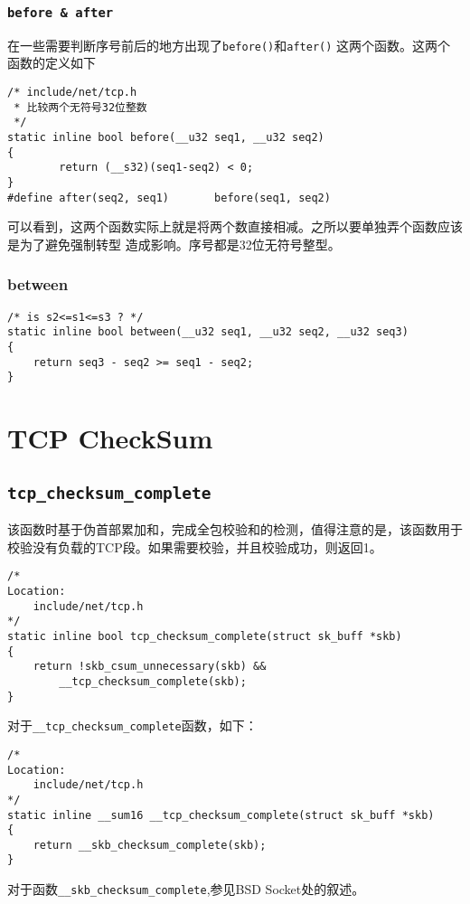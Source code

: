         \subsubsection{\texttt{before & after}}
            在一些需要判断序号前后的地方出现了\texttt{before()}和\texttt{after()}
            这两个函数。这两个函数的定义如下
\begin{verbatim}
/* include/net/tcp.h
 * 比较两个无符号32位整数
 */
static inline bool before(__u32 seq1, __u32 seq2)
{
        return (__s32)(seq1-seq2) < 0;
}
#define after(seq2, seq1)       before(seq1, seq2)
\end{verbatim}
        可以看到，这两个函数实际上就是将两个数直接相减。之所以要单独弄个函数应该是为了避免强制转型
        造成影响。序号都是32位无符号整型。
        \subsubsection{between}

\begin{verbatim}
/* is s2<=s1<=s3 ? */
static inline bool between(__u32 seq1, __u32 seq2, __u32 seq3)
{
    return seq3 - seq2 >= seq1 - seq2;
}
\end{verbatim}

\section{TCP CheckSum}
    \subsection{\texttt{tcp_checksum_complete}}
            \label{TCPCheckSum:tcp_checksum_complete}
            该函数时基于伪首部累加和，完成全包校验和的检测，值得注意的是，该函数用于
            校验没有负载的TCP段。如果需要校验，并且校验成功，则返回1。
\begin{verbatim}
/*
Location:
    include/net/tcp.h
*/
static inline bool tcp_checksum_complete(struct sk_buff *skb)
{
    return !skb_csum_unnecessary(skb) &&
        __tcp_checksum_complete(skb);
}
\end{verbatim}
            对于\texttt{__tcp_checksum_complete}函数，如下：
\begin{verbatim}
/*
Location:
    include/net/tcp.h
*/
static inline __sum16 __tcp_checksum_complete(struct sk_buff *skb)
{
    return __skb_checksum_complete(skb);
}
\end{verbatim}
            对于函数\texttt{__skb_checksum_complete},参见BSD Socket处的叙述。


